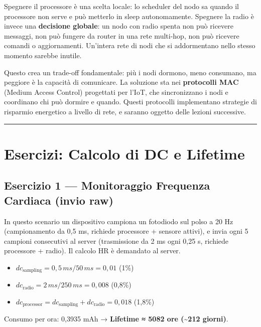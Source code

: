 \documentclass[
  italian,
  openany]{book}
\providecommand{\tightlist}{%
  \setlength{\itemsep}{0pt}\setlength{\parskip}{0pt}}
\begin{document}
Spegnere il processore è una scelta locale: lo scheduler del nodo sa
quando il processore non serve e può metterlo in sleep autonomamente.
Spegnere la radio è invece una \textbf{decisione globale}: un nodo con
radio spenta non può ricevere messaggi, non può fungere da router in una
rete multi-hop, non può ricevere comandi o aggiornamenti. Un'intera rete
di nodi che si addormentano nello stesso momento sarebbe inutile.

Questo crea un trade-off fondamentale: più i nodi dormono, meno
consumano, ma peggiore è la capacità di comunicare. La soluzione sta nei
\textbf{protocolli MAC} (Medium Access Control) progettati per l'IoT,
che sincronizzano i nodi e coordinano chi può dormire e quando. Questi
protocolli implementano strategie di risparmio energetico a livello di
rete, e saranno oggetto delle lezioni successive.

\begin{center}\rule{0.5\linewidth}{0.5pt}\end{center}

\section{Esercizi: Calcolo di DC e
Lifetime}\label{esercizi-calcolo-di-dc-e-lifetime}

\subsection{Esercizio 1 --- Monitoraggio Frequenza Cardiaca (invio
raw)}\label{esercizio-1-monitoraggio-frequenza-cardiaca-invio-raw}

In questo scenario un dispositivo campiona un fotodiodo sul polso a 20
Hz (campionamento da 0,5 ms, richiede processore + sensore attivi), e
invia ogni 5 campioni consecutivi al server (trasmissione da 2 ms ogni
0,25 s, richiede processore + radio). Il calcolo HR è demandato al
server.

\begin{itemize}
\tightlist
\item
  \(dc_\text{sampling} = 0,5\,ms / 50\,ms = 0,01\) (1\%)
\item
  \(dc_\text{radio} = 2\,ms / 250\,ms = 0,008\) (0,8\%)
\item
  \(dc_\text{processor} = dc_\text{sampling} + dc_\text{radio} = 0,018\)
  (1,8\%)
\end{itemize}

Consumo per ora: 0,3935 mAh → \textbf{Lifetime ≈ 5082 ore
(\textasciitilde212 giorni)}.
\end{document}
